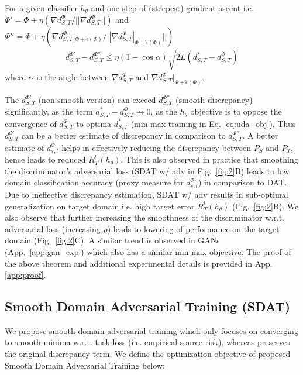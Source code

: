 \documentclass[table,dvipsnames]{article}
\theoremstyle{plain}
\theoremstyle{definition}
\theoremstyle{remark}
\begin{document}
\begin{theorem}
\label{th:suboptimality}
For a given classifier $h_{\theta}$ and one step of (steepest) gradient ascent i.e. $\Phi' = \Phi + \eta (\nabla d_{S,T}^{\Phi}/||\nabla d_{S,T}^{\Phi}||)$ and $\Phi'' = \Phi + \eta (\nabla d_{S,T}^{\Phi}|_{\Phi + \hat{\epsilon}(\Phi)}/||\nabla d_{S,T}^{\Phi}|_{\Phi + \hat{\epsilon}(\Phi)}||)$ 
\begin{equation}
\begin{split}
         d_{S,T}^{\Phi'} - d_{S,T}^{\Phi''} \leq  \eta(1 - \cos \alpha)\sqrt{2L(d^*_{S,T} - d^{\Phi}_{S,T}) }
\end{split}
\end{equation}
where $\alpha$ is the angle between $\nabla d_{S,T}^{\Phi}$ and $\nabla d_{S,T}^{\Phi}|_{\Phi + \hat{\epsilon}(\Phi)}$. 
\end{theorem}

The $d_{S,T}^{\Phi'}$ (non-smooth version) can exceed $d_{S,T}^{\Phi''}$ (smooth discrepancy) significantly, as the term $d_{S,T}^* -  d_{S,T}^{\Phi}  \not\to 0$, as the $h_{\theta}$ objective is to oppose the convergence of $d_{S,T}^{\Phi}$ to optima $d_{S,T}^*$ (min-max training in Eq. \ref{eq:uda_obj}). Thus $d_{S,T}^{\Phi'}$ can be a better estimate of discrepancy in comparison to $d_{S,T}^{\Phi''}$. A better estimate of $d_{s,t}^{\Phi}$ helps in effectively reducing the discrepancy between $P_S$ and $P_T$, hence leads to reduced $R_{T}^l(h_{\theta})$. This is also observed in practice that smoothing the discriminator's adversarial loss (SDAT w/ adv in Fig.\ \ref{fig:2}\textcolor{mydarkblue}{B}) leads to low domain classification accuracy (proxy measure for $d_{s,t}^{\Phi}$) in comparison to DAT. 
Due to ineffective discrepancy estimation, SDAT w/ adv results in sub-optimal generalization on target domain i.e. high target error $R_{T}^l(h_{\theta})$ (Fig.\ \ref{fig:2}\textcolor{mydarkblue}{B}). We also observe that further increasing the smoothness of the discriminator w.r.t. adversarial loss (increasing $\rho$) leads to lowering of performance on the target domain (Fig.\ \ref{fig:2}\textcolor{mydarkblue}{C}). A similar trend is observed in GANs (App.\ \ref{app:gan_exp}) which also has a similar min-max objective. The proof of the above theorem and additional experimental details is provided in App. \ref{app:proof}.

\subsection{Smooth Domain Adversarial Training (SDAT)}
We propose smooth domain adversarial training which only focuses on converging to smooth minima w.r.t. {task} loss (i.e. empirical source risk), whereas preserves the original discrepancy term. We define the optimization objective of proposed Smooth Domain Adversarial Training below:
\end{document}
